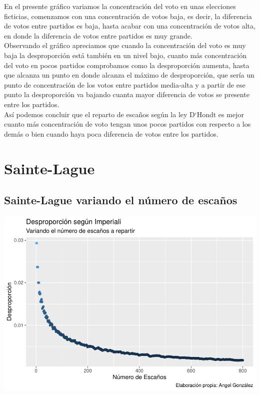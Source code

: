 \documentclass[12pt,a4paper,]{book}
\numberwithin{dummy}{section}
\theoremstyle{ocrenumbox}
\theoremstyle{blacknumex}
\theoremstyle{blacknumbox}
\theoremstyle{ocrenum}
\theoremstyle{ocrenum}
\begin{document}
En el presente gráfico variamos la concentración del voto en unas
elecciones ficticias, comenzamos con una concentración de votos baja, es
decir, la diferencia de votos entre partidos es baja, hasta acabar con
una concentración de votos alta, en donde la diferencia de votos entre
partidos es muy grande.\\
Observando el gráfico apreciamos que cuando la concentración del voto es
muy baja la desproporción está también en un nivel bajo, cuanto más
concentración del voto en pocos partidos comprobamos como la
desproporción aumenta, hasta que alcanza un punto en donde alcanza el
máximo de desproporción, que sería un punto de concentración de los
votos entre partidos media-alta y a partir de ese punto la desproporción
va bajando cuanta mayor diferencia de votos se presente entre los
partidos.\\
Así podemos concluir que el reparto de escaños según la ley D`Hondt es
mejor cuanto más concentración de voto tengan unos pocos partidos con
respecto a los demás o bien cuando haya poca diferencia de votos entre
los partidos.

\hypertarget{sainte-lague}{%
\section{Sainte-Lague}\label{sainte-lague}}

\hypertarget{sainte-lague-variando-el-nuxfamero-de-escauxf1os}{%
\subsection{Sainte-Lague variando el número de
escaños}\label{sainte-lague-variando-el-nuxfamero-de-escauxf1os}}

\begin{center}\includegraphics[width=0.95\linewidth]{figurasR/unnamed-chunk-21-1} \end{center}
\end{document}
